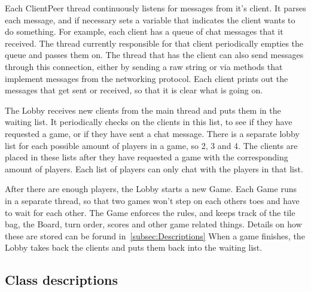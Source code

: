 \documentclass[12pt, letterpaper]{article}
\begin{document}
    Each ClientPeer thread continuously listens for messages from it's client.
    It parses each message, and if necessary sets a variable that indicates the client wants to do something.
    For example, each client has a queue of chat messages that it received.
    The thread currently responsible for that client periodically empties the queue and passes them on.
    The thread that has the client can also send messages through this connection, either by sending a raw string
    or via methods that implement messages from the networking protocol.
    Each client prints out the messages that get sent or received, so that it is clear what is going on.

    The Lobby receives new clients from the main thread and puts them in the waiting list.
    It periodically checks on the clients in this list, to see if they have requested a game, or if they have
    sent a chat message.
    There is a separate lobby list for each possible amount of players in a game, so 2, 3 and 4.
    The clients are placed in these lists after they have requested a game with the corresponding amount of players.
    Each list of players can only chat with the players in that list.

    After there are enough players, the Lobby starts a new Game.
    Each Game runs in a separate thread, so that two games won't step on each others toes
    and have to wait for each other.
    The Game enforces the rules, and keeps track of the tile bag, the Board, turn order, scores and other game
    related things.
    Details on how these are stored can be forund in~\autoref{subsec:Descriptions}
    When a game finishes, the Lobby takes back the clients and puts them back into the waiting list.


    \subsection{Class descriptions}
    \label{subsec:Descriptions}

\end{document}
